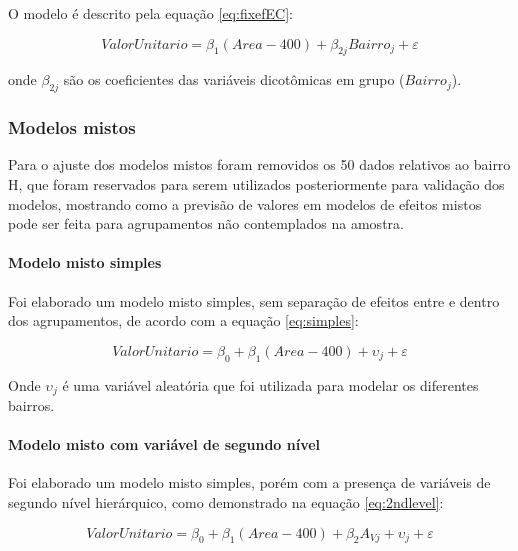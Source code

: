 \documentclass[
  a4paper, 11pt]{article}
\begin{document}
O modelo é descrito pela equação \ref{eq:fixefEC}:

\begin{equation} \label{eq:fixefEC}
ValorUnitario = \beta_1 (Area - 400) + \beta_{2j}Bairro_j + \varepsilon
\end{equation}

onde \(\beta_{2j}\) são os coeficientes das variáveis dicotômicas em
grupo (\(Bairro_j\)).

\hypertarget{modelos-mistos}{%
\subsubsection{Modelos mistos}\label{modelos-mistos}}

Para o ajuste dos modelos mistos foram removidos os 50 dados relativos
ao bairro H, que foram reservados para serem utilizados posteriormente
para validação dos modelos, mostrando como a previsão de valores em
modelos de efeitos mistos pode ser feita para agrupamentos não
contemplados na amostra.

\hypertarget{modelo-misto-simples}{%
\paragraph{Modelo misto simples}\label{modelo-misto-simples}}

Foi elaborado um modelo misto simples, sem separação de efeitos entre e
dentro dos agrupamentos, de acordo com a equação \ref{eq:simples}:

\begin{equation} \label{eq:simples}
ValorUnitario = \beta_0 + \beta_1 (Area - 400) + \upsilon_j + \varepsilon
\end{equation}

Onde \(\upsilon_j\) é uma variável aleatória que foi utilizada para
modelar os diferentes bairros.

\hypertarget{modelo-misto-com-variuxe1vel-de-segundo-nuxedvel}{%
\paragraph{Modelo misto com variável de segundo
nível}\label{modelo-misto-com-variuxe1vel-de-segundo-nuxedvel}}

Foi elaborado um modelo misto simples, porém com a presença de variáveis
de segundo nível hierárquico, como demonstrado na equação
\ref{eq:2ndlevel}:

\begin{equation} \label{eq:2ndlevel}
ValorUnitario = \beta_0 + \beta_1 (Area - 400) + \beta_2 A_{Vj}+ \upsilon_j + \varepsilon
\end{equation}
\end{document}
